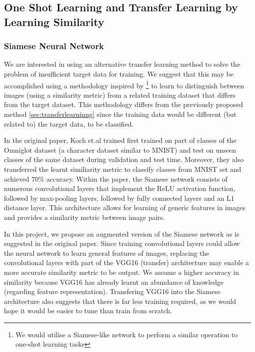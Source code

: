 \documentclass{article}
\begin{document}
\subsection{One Shot Learning and Transfer Learning by Learning Similarity}
\label{sec:oneshot}

\subsubsection{\textbf{Siamese Neural Network}}

We are interested in using an alternative transfer learning method to solve the problem of insufficient target data for training. We suggest that this may be accomplished using a methodology inspired by \cite{koch}\footnote{We would utilise a Siamese-like network to perform a similar operation to one-shot learning tasks} to learn to distinguish between images (using a similarity metric) from a related training dataset that differs from the target dataset. This methodology differs from the previously proposed method \ref{sec:transferlearninng} since the training data would be different (but related to) the target data, to be classified.

In the original paper, Koch et.al trained first trained on part of classes of the Omniglot dataset (a character dataset similar to MNIST) and test on unseen classes of the same dataset during validation and test time. Moreover, they also transferred the learnt similiarity metric to classify classes from MNIST set and achieved $70\%$ accuracy. Within the paper, the Siamese network consists of numerous convolutional layers that implement the ReLU activation function, followed by max-pooling layers, followed by fully connected layers and an L1 distance layer. This architecture allows for learning of generic features in images and provides a similarity metric between image pairs.

In this project, we propose an augmented version of the Siamese network as is suggested in the original paper. Since training convolutional layers could allow the neural network to learn general features of images, replacing the convolutional layers with part of the VGG16 (transfer) architecture may enable a more accurate similarity metric to be output. We assume a higher accuracy in similarity because VGG16 has already learnt an abundance of knowledge (regarding feature representation). Transfering VGG16 into the Siamese architecture also suggests that there is far less training required, as we would hope it would be easier to tune than train from scratch.
\end{document}
